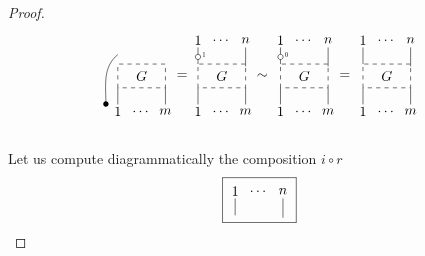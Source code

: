 \begin{proof}
\begin{equation*}
{\begin{tikzpicture}[scale=.6]
		\draw [dashed] (0,0) rectangle (2,1); \node at (1, .5) {$G$};
		
		\node at (-.5,-.7) {$\bullet$}; \draw (-.5,-.7)  to[out=90,in=-140]  (0,1.4);
		\node at (0,-1) {$1$}; \draw (0,-.7) -- (0,0);
		\node at (1,-1) {$\dots$};
		\node at (2,-1) {$m$}; \draw (2,-.7) -- (2,0);
		\node at (2.7,.5) {$=$}; 
		\end{tikzpicture}
		\!
		\begin{tikzpicture}[scale=.6]
		\node at (0,2) {$1$}; \draw (0,1.7) -- (0,1);
		\draw [fill=white] (0,1.3) circle [radius=0.11];
		\node at (.25,1.4)[scale = .5]{$1$};
		\node at (1,2) {$\dots$};
		\node at (2,2) {$n$}; \draw (2,1.7) -- (2,.9);
		
		\draw [dashed] (0,0) rectangle (2,1); \node at (1, .5) {$G$};
		
		\node at (0,-1) {$1$}; \draw (0,-.7) -- (0,0);
		\node at (1,-1) {$\dots$};
		\node at (2,-1) {$m$}; \draw (2,-.7) -- (2,0);
		\node at (2.7,.5) {$\sim$}; 
		\end{tikzpicture}
		\begin{tikzpicture}[scale=.6]
		\node at (0,2) {$1$}; \draw (0,1.7) -- (0,1);
		\draw [fill=white] (0,1.3) circle [radius=0.11];
		\node at (.25,1.4)[scale = .5]{$0$};
		\node at (1,2) {$\dots$};
		\node at (2,2) {$n$}; \draw (2,1.7) -- (2,.9);
		
		\draw [dashed] (0,0) rectangle (2,1); \node at (1, .5) {$G$};
		
		\node at (0,-1) {$1$}; \draw (0,-.7) -- (0,0);
		\node at (1,-1) {$\dots$};
		\node at (2,-1) {$m$}; \draw (2,-.7) -- (2,0);
		\node at (2.7,.5) {$=$}; 
		\end{tikzpicture}
		\begin{tikzpicture}[scale=.6]
		\node at (0,2) {$1$}; \draw (0,1.7) -- (0,1);
		\node at (1,2) {$\dots$};
		\node at (2,2) {$n$}; \draw (2,1.7) -- (2,.9);
		
		\draw [dashed] (0,0) rectangle (2,1); \node at (1, .5) {$G$};
		
		\node at (0,-1) {$1$}; \draw (0,-.7) -- (0,0);
		\node at (1,-1) {$\dots$};
		\node at (2,-1) {$m$}; \draw (2,-.7) -- (2,0);
		\end{tikzpicture}
	}
	\end{equation*}\\
	Let us compute diagrammatically the composition $i\circ r$\\
	\begin{equation*}
	\boxed{\begin{tikzpicture}[scale=.6]
		\node at (0,2) {$1$}; \draw (0,1.7) -- (0,1);
		\node at (1,2) {$\dots$};
		\node at (2,2) {$n$}; \draw (2,1.7) -- (2,.9);
		

\end{tikzpicture}}
\end{equation*}
\end{proof}
